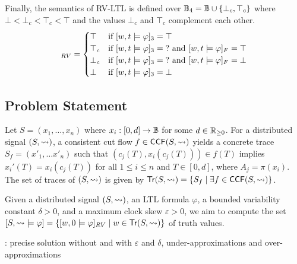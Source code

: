 Finally, the semantics of RV-LTL is defined over $\mathbb{B}_4 = \mathbb{B} \cup \{\bot_c, \top_c \}$ where $\bot < \bot_c < \top_c < \top$ and the values $\bot_c$ and $\top_c$ complement each other.
\begin{align*}
	[w,t \models \varphi]_{RV} &= \begin{cases}
		\top &\text{if } [w,t \models \varphi]_3 = \top \\
		\top_c &\text{if } [w,t \models \varphi]_3 = \? \text{ and } [w,t \models \varphi]_F = \top \\
		\bot_c &\text{if } [w,t \models \varphi]_3 = \? \text{ and } [w,t \models \varphi]_F = \bot \\
		\bot &\text{if } [w,t \models \varphi]_3 = \bot \\
	\end{cases} \\
\end{align*}	

\subsection{Problem Statement}

Let $S = (x_1, \ldots, x_n)$ where $x_i : [0,d] \to \mathbb{B}$ for some $d \in \mathbb{R}_{\geq 0}$.
For a distributed signal $(S,{\rightsquigarrow})$, a consistent cut flow $f \in \mathsf{CCF}(S,{\rightsquigarrow})$ yields a concrete trace $S_f = (x'_1, \ldots x'_n)$ such that $(c_j(T), x_i(c_j(T))) \in f(T)$ implies $x_i'(T) = x_i(c_j(T))$ for all $1 \leq i \leq n$ and $T \in [0,d]$, where $A_j = \pi(x_i)$.
\alert{The set of traces of $(S,{\rightsquigarrow})$ is given by $\tr(S,{\hb}) = \{ S_f \st \exists f \in \CCF(S,{\hb})\}$.}


Given a distributed signal $(S, {\rightsquigarrow})$, an LTL formula $\varphi$, a bounded variability constant $\delta > 0$, and a maximum clock skew $\varepsilon > 0$, we aim to compute the set $[S, {\hb} \models \varphi] = \{ [w, 0 \models \varphi]_{RV} \st w \in \tr(S, {\hb}) \}$ of truth values.

\begin{example}
	\TODO: precise solution without and with $\varepsilon$ and $\delta$, under-approximations and over-approximations
\end{example}

